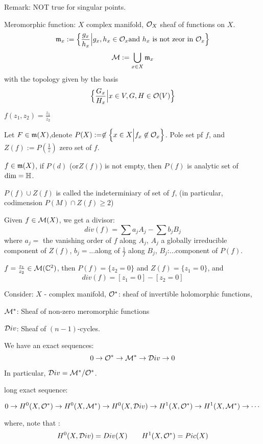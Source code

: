 Remark: NOT true for singular points.

Meromorphic function: $X$ complex manifold, $\mathcal{O}_X$
sheaf of functions on $X$.
$$\mathfrak{m}_x:=\Big\{ \frac{g_x}{h_x} \Big| g_x,h_x\in\mathcal{O}_x\text{and $h_x$ is not zeor in $\mathcal{O}_x$} \Big\}$$
$$
  \mathcal{M}:=\bigcup_{x\in X}\mathfrak{m}_x
$$
  with the topology given by the basis
$$
  \Big\{ \frac{G_x}{H_x} \Big| x\in V, G,H\in\mathcal{O}(V) \Big\}
$$

\begin{example}
$f(z_1,z_2)=\frac{z_1}{z_2}$
\end{example}

\begin{definition}
Let $F\in\mathfrak{m}(X)$,denote
$P(X):=\not\in \Big\{ x\in X \Big| f_x\not\in\mathcal{O}_x \Big\}$.
Pole set pf $f$, and
$Z(f):=P(\frac{1}{z})$ zero set of $f$.
\end{definition}

\begin{thm}
$f\in\mathfrak{m}(X)$, if $P(d)$ (or$Z(f)$) is not empty,
then $P(f)$ is analytic set of $\dim=\mathbb{H}$.
\end{thm}

\begin{definition}
$P(f)\cup Z(f)$ is called the indeterminiary of set of $f$,
(in particular, codimension $P(M)\cap Z(f)\geq 2$)
\end{definition}

\begin{prop}
Given $f\in\mathcal{M}(X)$, we get a divisor:
$$div(f)=\sum a_jA_j-\sum b_jB_j$$
where $a_j=$ the vanishing order of $f$ along $A_j$,
$A_j$ a globally irreducible component of $Z(f)$,
$b_j=$...along of $\frac{1}{f}$ along $B_j$,
$B_j$:...component of $P(f)$.
\end{prop}

\begin{example}
$f=\frac{z_1}{z_2}\in\mathcal{M}(\mathbb{C}^2)$, then
$P(f)=\{z_2=0\}$ and $Z(f)=\{z_1=0\}$, and
$$div(f)=[z_1=0]-[z_2=0]$$
\end{example}

Consider: $X$ - complex manifold, $\mathcal{O}^*$:
sheaf of invertible holomorphic functions,

$\mathcal{M}^*$: Sheaf of non-zero meromorphic functions

$\mathcal{D} iv$: Sheaf of $(n-1)$-cycles.

\begin{prop}
We have an exact sequences:
$$0\to\mathcal{O}^*\to\mathcal{M}^*\to\mathcal{D} iv\to 0$$

In particular, $\mathcal{D} iv=\mathcal{M}^*/\mathcal{O}^*$.

long exact sequence:

$$0\to H^0(X,\mathcal{O}^*)\to H^0(X,\mathcal{M}^*)\to H^0(X,\mathcal{D} iv)
\to H^1(X,\mathcal{O}^*)\to H^1(X,\mathcal{M}^*)\to\cdots$$
\end{prop}
where, note that :
$$H^0(X,\mathcal{D} iv)=Div(X)\qquad H^1(X,\mathcal{O}^*)=Pic(X)$$


